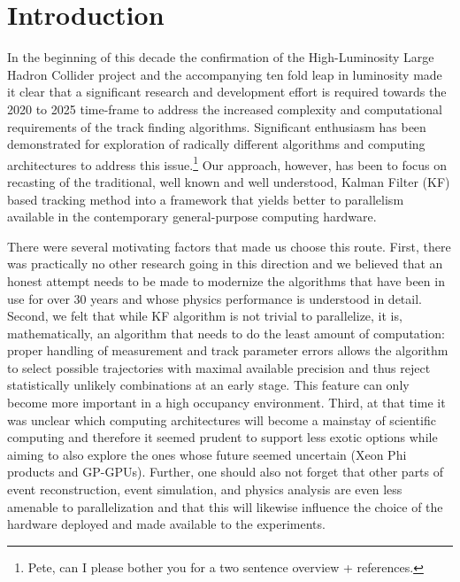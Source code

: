 \documentclass{webofc}
\begin{document}
\maketitle


\section{Introduction}

In the beginning of this decade the confirmation of the High-Luminosity Large
Hadron Collider project and the accompanying ten fold leap in luminosity made
it clear that a significant research and development effort is required
towards the 2020 to 2025 time-frame to address the increased complexity and
computational requirements of the track finding algorithms. Significant
enthusiasm has been demonstrated for exploration of radically different
algorithms and computing architectures to address this issue.\footnote{Pete,
  can I please bother you for a two sentence overview + references.} Our
approach, however, has been to focus on recasting of the traditional, well
known and well understood, Kalman Filter (KF) based tracking method into a
framework that yields better to parallelism available in the contemporary
general-purpose computing hardware.

There were several motivating factors that made us choose this route. First,
there was practically no other research going in this direction and we
believed that an honest attempt needs to be made to modernize the algorithms
that have been in use for over 30 years and whose physics performance is
understood in detail.  Second, we felt that while KF algorithm is not trivial
to parallelize, it is, mathematically, an algorithm that needs to do the least
amount of computation: proper handling of measurement and track parameter
errors allows the algorithm to select possible trajectories with maximal
available precision and thus reject statistically unlikely combinations at an
early stage. This feature can only become more important in a high occupancy
environment. Third, at that time it was unclear which computing architectures
will become a mainstay of scientific computing and therefore it seemed prudent
to support less exotic options while aiming to also explore the ones whose
future seemed uncertain (Xeon Phi products and GP-GPUs). Further, one should
also not forget that other parts of event reconstruction, event simulation,
and physics analysis are even less amenable to parallelization and that this
will likewise influence the choice of the hardware deployed and made available
to the experiments.
\end{document}
